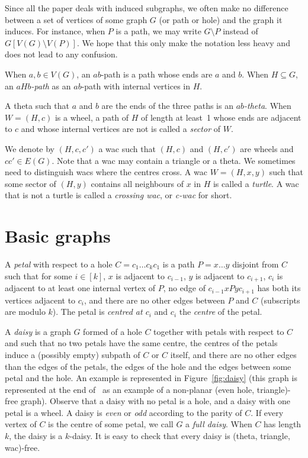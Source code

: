 \documentclass[11pt]{article}
\newcommand{\sm}{\setminus}
\begin{document}
Since all the paper deals with induced subgraphs, we often make no difference between a set of vertices of some graph $G$ (or path or hole) and the graph it induces.  For instance, when $P$ is a path, we may write $G\sm P$ instead of $G[V(G) \sm V(P)]$.  We hope that this only make the notation less heavy and does not lead to any confusion. 

When $a, b\in V(G)$, an $ab$-path is a path whose ends are $a$ and $b$. When $H\subseteq G$, an {\it $aHb$-path} as an $ab$-path with internal vertices in $H$. 

A theta such that $a$ and $b$ are the ends of the three paths is an \emph{$ab$-theta}. When $W=(H, c)$ is a wheel, a path of $H$ of length at least~1 whose ends are adjacent to $c$ and whose internal vertices are not is called a \emph{sector} of $W$.  

We denote by  $(H, c, c')$ a wac such that $(H, c)$ and $(H, c')$ are wheels and $cc'\in E(G)$. 
Note that a wac may contain a triangle or a theta.   We sometimes need to distinguish wacs where the centres cross. A wac $W=(H, x, y)$ such that some sector of $(H, y)$ contains all neighbours of $x$ in $H$ is called a \emph{turtle}.  A wac that is not a turtle is called a \emph{crossing wac}, or \emph{c-wac} for short.


\section{Basic graphs}
\label{sec:basic}

A \emph{petal} with respect to a hole $C = c_1 \dots c_k c_1$ is a path $P = x \dots y$ disjoint from $C$ such that for some $i\in [k]$, $x$ is adjacent to $c_{i-1}$, $y$ is adjacent to $c_{i+1}$, $c_i$ is adjacent to at least one internal vertex of $P$, no edge of $c_{i-1} x P y c_{i+1}$ has both its vertices adjacent to $c_i$, and there are no other edges between $P$ and $C$ (subscripts are modulo $k$). 
The petal is \emph{centred at $c_i$} and $c_i$  the \emph{centre} of the petal.

A \emph{daisy} is a graph $G$ formed of a hole $C$ together with petals with respect to $C$ and such that no two petals have the same centre,  the centres of the petals induce a (possibly empty) subpath of $C$ or $C$ itself, and there are no other edges than the edges of the petals, the edges of the hole and the edges between some petal and the hole. 
An example is represented in Figure~\ref{fig:daisy} (this graph is represented at the end of~\cite{DBLP:journals/jgt/ConfortiCKV00} as an example of a non-planar (even hole, triangle)-free graph).   
Observe that a daisy with no petal is a hole, and a daisy with one petal is a wheel.  
A daisy is \emph{even} or \emph{odd} according to the parity of $C$. 
If every vertex of $C$ is the centre of some petal, we call $G$ a \emph{full daisy}. When $C$ has length $k$, the daisy is a $k$-daisy.  It is easy to check that every daisy is (theta, triangle, wac)-free.
\end{document}
